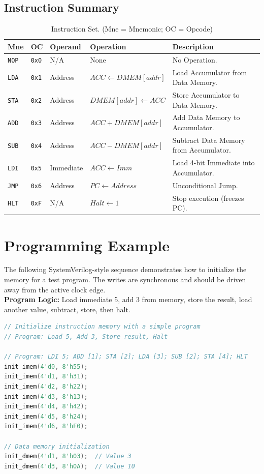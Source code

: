 \documentclass{article}
\begin{document}
\subsection{Instruction Summary}
\begin{table}[!ht]
\caption{Instruction Set. (Mne = Mnemonic; OC = Opcode)}
\centering
\begin{tabular}{|l|l|l|l|l|}
\hline
\textbf{Mne} & \textbf{OC} & \textbf{Operand} & \textbf{Operation} & \textbf{Description} \\ \hline
\texttt{NOP} & \texttt{0x0} & N/A & None & No Operation. \\ \hline
\texttt{LDA} & \texttt{0x1} & Address & $ACC \leftarrow DMEM[addr]$ & Load Accumulator from Data Memory. \\ \hline
\texttt{STA} & \texttt{0x2} & Address & $DMEM[addr] \leftarrow ACC$ & Store Accumulator to Data Memory. \\ \hline
\texttt{ADD} & \texttt{0x3} & Address & $ACC + DMEM[addr]$ & Add Data Memory to Accumulator. \\ \hline
\texttt{SUB} & \texttt{0x4} & Address & $ACC - DMEM[addr]$ & Subtract Data Memory from Accumulator. \\ \hline
\texttt{LDI} & \texttt{0x5} & Immediate & $ACC \leftarrow Imm$ & Load 4-bit Immediate into Accumulator. \\ \hline
\texttt{JMP} & \texttt{0x6} & Address & $PC \leftarrow Address$ & Unconditional Jump. \\ \hline
\texttt{HLT} & \texttt{0xF} & N/A & $Halt \leftarrow 1$ & Stop execution (freezes PC). \\ \hline
\end{tabular}
\end{table}

\section{Programming Example}



The following SystemVerilog-style sequence demonstrates how to initialize the memory for a test program. The writes are synchronous and should be driven away from the active clock edge.
\\
\textbf{Program Logic:} Load immediate 5, add 3 from memory, store the result, load another value, subtract, store, then halt.

\begin{lstlisting}[language=Verilog, frame=single, basicstyle=\small\ttfamily]
// Initialize instruction memory with a simple program
// Program: Load 5, Add 3, Store result, Halt

// Program: LDI 5; ADD [1]; STA [2]; LDA [3]; SUB [2]; STA [4]; HLT
init_imem(4'd0, 8'h55);
init_imem(4'd1, 8'h31);
init_imem(4'd2, 8'h22);
init_imem(4'd3, 8'h13);
init_imem(4'd4, 8'h42);
init_imem(4'd5, 8'h24);
init_imem(4'd6, 8'hF0);

// Data memory initialization
init_dmem(4'd1, 8'h03);  // Value 3
init_dmem(4'd3, 8'h0A);  // Value 10
\end{lstlisting}
\end{document}
